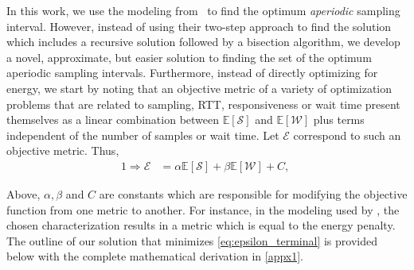 In this work, we use the modeling from~\cite{Moothedath2022Aperiodic} to find the optimum \emph{aperiodic} sampling interval.
However, instead of using their two-step approach to find the solution which includes a recursive solution followed by a bisection algorithm, we develop a novel, approximate, but easier solution to finding the set of the optimum aperiodic sampling intervals.
Furthermore, instead of directly optimizing for energy, we start by noting that an objective metric of a variety of optimization problems that are related to sampling, RTT, responsiveness or wait time present themselves 
as a linear combination between $\mathbb{E}[\mathcal{S}]$ and $\mathbb{E}[\mathcal{W}]$ plus terms independent of the number of samples or wait time.
Let $\mathcal{E}$ correspond to such an objective metric.
Thus,
\begin{alignat}{1}
    \Rightarrow\mathcal{E}&=\alpha\mathbb{E}[\mathcal{S}]+\beta\mathbb{E}[\mathcal{W}]+C,\;\label{eq:epsilon_terminal}
\end{alignat}

Above, $\alpha, \beta$ and $C$ are constants which are responsible for modifying the objective function from one metric to another.
For instance, in the modeling used by \textcite{Moothedath2021EnergyOptimal,Moothedath2022EnergyEfficient,Moothedath2022Aperiodic}, the chosen characterization results in a metric which is equal to the energy penalty.
The outline of our solution that minimizes \cref{eq:epsilon_terminal} is provided below with the complete mathematical derivation in \cref{appx1}.

\bigskip

